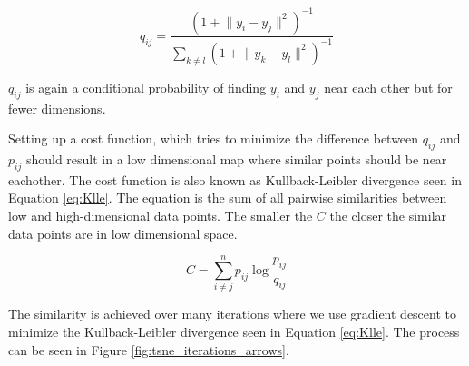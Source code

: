 \begin{equation}
\label{eq:gij}
q_{ij} = \frac{(1+\lVert y_i - y_j \rVert^2)^{-1}}{\sum_{k \neq l} (1+\lVert y_k - y_l \rVert^2)^{-1}} 
\end{equation}

$q_{ij}$ is again a conditional probability of finding $y_i$ and $y_j$ near each other but for fewer dimensions.

Setting up a cost function, which tries to minimize the difference between $q_{ij}$ and $p_{ij}$ should result in a low dimensional map where similar points should be near eachother.
The cost function is also known as Kullback-Leibler divergence seen in Equation \ref{eq:Klle}. 
The equation is the sum of all pairwise similarities between low and high-dimensional data points.
The smaller the $C$ the closer the similar data points are in low dimensional space.

\begin{equation}
\label{eq:Klle}
 C = \sum_{i \neq j}^n p_{ij} \log \frac{p_{ij}}{q_{ij}}
\end{equation}

The similarity is achieved over many iterations where we use gradient descent to minimize the Kullback-Leibler divergence seen in Equation \ref{eq:Klle}. 
The process can be seen in Figure \ref{fig:tsne_iterations_arrows}.

